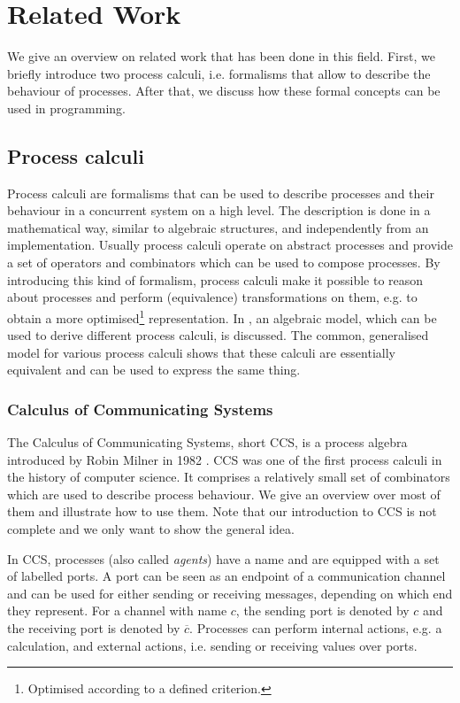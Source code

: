\chapter{Related Work}
We give an overview on related work that has been done in this field. First, we briefly introduce two process calculi, i.e. formalisms that allow to describe the behaviour of processes. After that, we discuss how these formal concepts can be used in programming.

\section{Process calculi}
\label{chp:process_calculi}
Process calculi are formalisms that can be used to describe processes and their behaviour in a concurrent system on a high level. The description is done in a mathematical way, similar to algebraic structures, and independently from an implementation. Usually process calculi operate on abstract processes and provide a set of operators and combinators which can be used to compose processes. By introducing this kind of formalism, process calculi make it possible to reason about processes and perform (equivalence) transformations on them, e.g. to obtain a more optimised\footnote{Optimised according to a defined criterion.} representation. In \cite{Hoare:2012:LPU:2368298.2368301}, an algebraic model, which can be used to derive different process calculi, is discussed. The common, generalised model for various process calculi shows that these calculi are essentially equivalent and can be used to express the same thing.

\subsection{Calculus of Communicating Systems}
The Calculus of Communicating Systems, short \textsc{CCS}, is a process algebra introduced by Robin Milner in 1982 \cite{Milner:1982:CCS:539036}. \textsc{CCS} was one of the first process calculi in the history of computer science. It comprises a relatively small set of combinators which are used to describe process behaviour. We give an overview over most of them and illustrate how to use them. Note that our introduction to \textsc{CCS} is not complete and we only want to show the general idea.

In \textsc{CCS}, processes (also called \textit{agents}) have a name and are equipped with a set of labelled ports. A port can be seen as an endpoint of a communication channel and can be used for either sending or receiving messages, depending on which end they represent. For a channel with name $c$, the sending port is denoted by $c$ and the receiving port is denoted by $\overline{c}$. Processes can perform internal actions, e.g. a calculation, and external actions, i.e. sending or receiving values over ports. 

